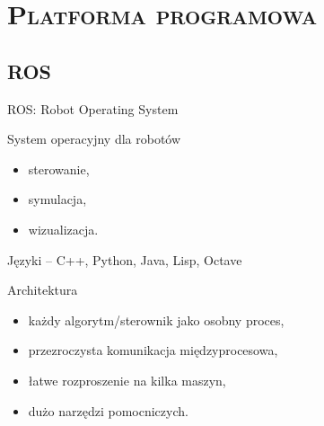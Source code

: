 \documentclass[xcolor=x11names,compress]{beamer}
\renewcommand{\(}{\begin{columns}}
\renewcommand{\)}{\end{columns}}
\newcommand{\<}[1]{\begin{column}{#1}}
\renewcommand{\>}{\end{column}}
\begin{document}
%
%
\section{\scshape Platforma programowa}

\subsection{\vspace{.3cm}ROS}

\begin{frame}{ROS: Robot Operating System}

    \alert{System operacyjny dla robotów}
    \begin{itemize}
    \item sterowanie,
    \item symulacja,
    \item wizualizacja.
    \end{itemize}

    \vspace{.5cm}

    \alert{Języki} -- C++, Python, Java, Lisp, Octave

    \vspace{.5cm}

    \alert{Architektura}
    \begin{itemize}
    \item każdy algorytm/sterownik jako osobny proces,
    \item przezroczysta komunikacja międzyprocesowa,
    \item łatwe rozproszenie na kilka maszyn,
    \item dużo narzędzi pomocniczych.
    \end{itemize}

\end{frame}
\end{document}
